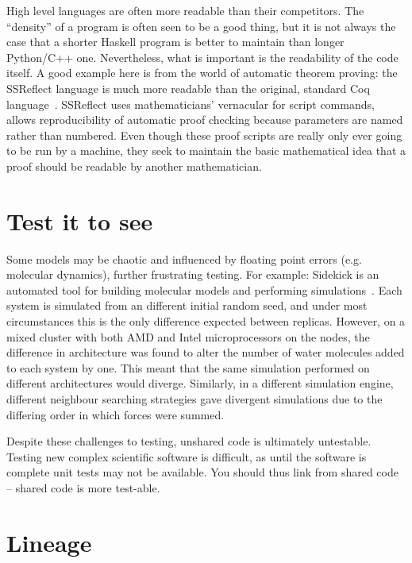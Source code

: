 \documentclass[10pt,conference,final]{IEEEtran}
\begin{document}
High level languages are often more readable than their
competitors. The ``density'' of a program is often seen to be a good
thing, but it is not always the case that a shorter Haskell program is
better to maintain than longer Python/C++ one. Nevertheless, what is
important is the readability of the code itself. A good example here
is from the world of automatic theorem proving: the SSReflect language
is much more readable than the original, standard Coq
language~\cite{GonthierZND13}. SSReflect uses mathematicians'
vernacular for script commands, allows reproducibility of automatic
proof checking because parameters are named rather than numbered. 
Even though these proof scripts are really only ever going to be
run by a machine, they seek to maintain the basic mathematical idea
that a proof should be readable by another mathematician.

\section{Test it to see}

Some models may be chaotic and influenced by floating point errors
(e.g. molecular dynamics), further frustrating testing. For example:
Sidekick is an automated tool for building molecular models and
performing simulations~\cite{Hall2014Sidekick}. Each system is
simulated from an different initial random seed, and under most
circumstances this is the only difference expected between
replicas. However, on a mixed cluster with both AMD and Intel
microprocessors on the nodes, the difference in architecture was found
to alter the number of water molecules added to each system by
one. This meant that the same simulation performed on different
architectures would diverge. Similarly, in a different simulation
engine, different neighbour searching strategies gave divergent
simulations due to the differing order in which forces were summed.

Despite these challenges to testing, unshared code is ultimately
untestable.  Testing new complex scientific software is difficult, as
until the software is complete unit tests may not be available. You
should thus link from shared code -- shared code is more test-able.

\section{Lineage} 
\end{document}
